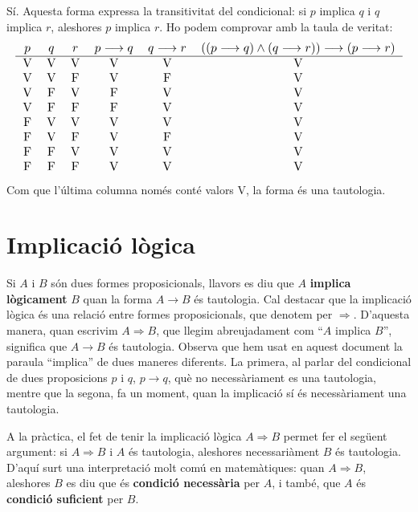 \begin{solucio}
Sí. Aquesta forma expressa la transitivitat del condicional: si $p$ implica
$q$ i $q$ implica $r$, aleshores $p$ implica $r$. Ho podem comprovar amb la
taula de veritat:
\begin{equation*}
\resizebox{\textwidth}{!}{\begin{tabular}{cccccc}
$p$ & $q$ & $r$ & $p\longrightarrow q$ & $q\longrightarrow r$ &
$\left((p\longrightarrow q)\wedge(q\longrightarrow r)\right)\longrightarrow(p\longrightarrow r)$ \\ \hline
V & V & V & V & V & V \\
V & V & F & V & F & V \\
V & F & V & F & V & V \\
V & F & F & F & V & V \\
F & V & V & V & V & V \\
F & V & F & V & F & V \\
F & F & V & V & V & V \\
F & F & F & V & V & V\end{tabular}}
\end{equation*}
Com que l'última columna només conté valors V, la forma és una tautologia.
\end{solucio}

\section{Implicació lògica\label{sec:implicacio-logica}}

Si $A$ i $B$ són dues formes proposicionals, llavors es diu que $A$
\textbf{implica lògicament} $B$ quan la forma $A\longrightarrow B$ és tautologia. Cal destacar que la implicació lògica és una relació entre formes proposicionals, que denotem per $\Longrightarrow$.
D'aquesta manera, quan escrivim $A\Longrightarrow B$, que llegim
abreujadament com \enquote{$A$ implica $B$}, significa que $A\longrightarrow B$ és tautologia. Observa que hem usat en aquest document la paraula \enquote{implica}
de dues maneres diferents. La primera, al parlar del condicional de dues
proposicions $p$ i $q$, $p\rightarrow q$, què no necessàriament es
una tautologia, mentre que la segona, fa un moment, quan la implicació sí és necessàriament una tautologia.

A la pràctica, el fet de tenir la implicació lògica $A\Longrightarrow B$ permet fer el següent argument: si $A\Longrightarrow
B$ i $A$ és tautologia, aleshores necessariàment $B$ és
tautologia. D'aquí surt una interpretació molt comú en matemàtiques: quan $A\Longrightarrow B$, aleshores $B$ es diu que és
\textbf{condició necessària} per $A$, i també, que $A$ és
\textbf{condició suficient} per $B$.

